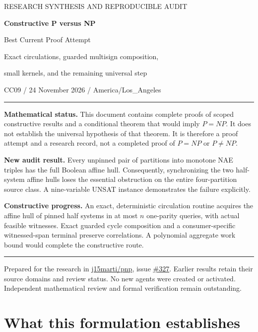\documentclass[11pt,letterpaper]{article}
\theoremstyle{definition}
\begin{document}
\begin{titlepage}
\vspace*{0.55in}
{\large RESEARCH SYNTHESIS AND REPRODUCIBLE AUDIT\par}
\vspace{0.35in}
{\Huge\bfseries Constructive P versus NP\par}
\vspace{0.18in}
{\LARGE Best Current Proof Attempt\par}
\vspace{0.12in}
{\Large Exact circulations, guarded multisign composition,\par
small kernels, and the remaining universal step\par}
\vspace{0.45in}
{\large CC09 / 24 November 2026 / America\!/Los\_Angeles\par}
\vspace{0.28in}
\rule{\textwidth}{0.7pt}
\textbf{Mathematical status.} This document contains complete proofs of scoped constructive results and a conditional theorem that would imply $P=NP$. It does not establish the universal hypothesis of that theorem. It is therefore a proof attempt and a research record, not a completed proof of $P=NP$ or $P\ne NP$.

\textbf{New audit result.} Every unpinned pair of partitions into monotone NAE triples has the full Boolean affine hull. Consequently, synchronizing the two half-system affine hulls loses the essential obstruction on the entire four-partition source class. A nine-variable UNSAT instance demonstrates the failure explicitly.

\textbf{Constructive progress.} An exact, deterministic circulation routine acquires the affine hull of pinned half systems in at most $n$ one-parity queries, with actual feasible witnesses. Exact guarded cycle composition and a consumer-specific witnessed-span terminal preserve correlations. A polynomial aggregate work bound would complete the constructive route.
\rule{\textwidth}{0.7pt}
\vfill
Prepared for the research in \href{https://github.com/j15marti/pnp}{j15marti/pnp}, issue \href{https://github.com/j15marti/pnp/issues/327}{\#327}. Earlier results retain their source domains and review status. No new agents were created or activated. Independent mathematical review and formal verification remain outstanding.
\end{titlepage}

\tableofcontents
\newpage

\section{What this formulation establishes}
\end{document}
